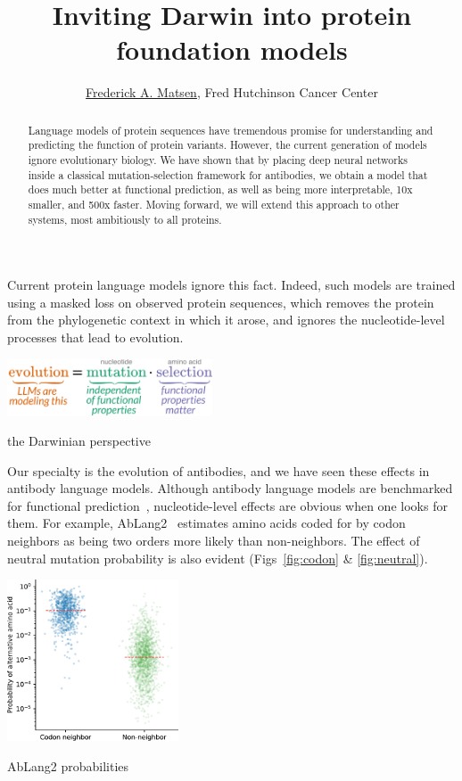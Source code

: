\documentclass[nobib]{tufte-handout}
\title{Inviting Darwin into protein foundation models}
\author{\href{http://matsen.fredhutch.org/}{Frederick A. Matsen}, Fred Hutchinson Cancer Center}
\begin{document}
\maketitle

\begin{abstract}
\noindent
Language models of protein sequences have tremendous promise for understanding and predicting the function of protein variants.
However, the current generation of models ignore evolutionary biology.
We have shown that by placing deep neural networks inside a classical mutation-selection framework for antibodies, we obtain a model that does much better at functional prediction, as well as being more interpretable, 10x smaller, and 500x faster.
Moving forward, we will extend this approach to other systems, most ambitiously to all proteins.
\end{abstract}

Current protein language models ignore this fact.
Indeed, such models are trained using a masked loss on observed protein sequences, which removes the protein from the phylogenetic context in which it arose, and ignores the nucleotide-level processes that lead to evolution.

\begin{marginfigure}[-9.9cm]%
  \hspace{-19pt}
  \includegraphics[width=2.4in]{figures/evolution-is-mut-and-sel.why.pdf}%
  \caption{the Darwinian perspective}
  \label{fig:darwin}
\end{marginfigure}

Our specialty is the evolution of antibodies, and we have seen these effects in antibody language models.
Although antibody language models are benchmarked for functional prediction~\cite{Chungyoun2024-fc}, nucleotide-level effects are obvious when one looks for them.
For example, AbLang2~\cite{Olsen2024-ablang2} estimates amino acids coded for by codon neighbors as being two orders more likely than non-neighbors.
The effect of neutral mutation probability is also evident (Figs~\ref{fig:codon} \& \ref{fig:neutral}).

\begin{marginfigure}[-7.8cm]%
  \hspace{-19pt}
  \includegraphics[width=2.0in]{figures/ablang2-neighbor-csp.pdf}%
  \caption{AbLang2 probabilities}
  \label{fig:codon}
\end{marginfigure}
\end{document}

